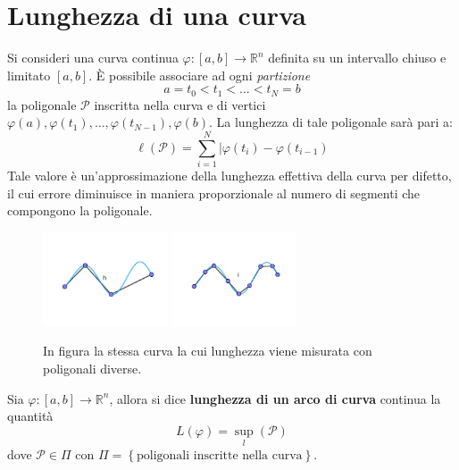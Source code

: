 \section{Lunghezza di una curva}
Si consideri una curva continua $\varphi:[a,b] \to \mathbb{R}^n$ definita su un intervallo chiuso e limitato $[a,b]$. È possibile associare ad ogni \textit{partizione} 
\begin{equation}
    a=t_0<t_1<...<t_N=b
\end{equation}
la poligonale $\mathcal{P}$ inscritta nella curva e di vertici $\varphi(a),\varphi(t_1),\dots,\varphi(t_{N-1}), \varphi(b)$. La lunghezza di tale poligonale sarà pari a:
\begin{equation}
    \ell(\mathcal{P})=\sum\limits_{i=1}^{N}{|\varphi(t_i)-\varphi(t_{i-1})}
\end{equation}
Tale valore è un'approssimazione della lunghezza effettiva della curva per difetto, il cui errore diminuisce in maniera proporzionale al numero di segmenti che compongono la poligonale.
\begin{figure}[H]
    \centering
    \includegraphics[width=0.33\textwidth]{Capitoli/Capitolo1/lunghezza1.png}
    \hspace{0.05\textwidth} %
    \includegraphics[width=0.33\textwidth]{Capitoli/Capitolo1/lunghezza2.png}
    \caption{In figura la stessa curva la cui lunghezza viene misurata con poligonali diverse.}
\end{figure}
\begin{definition}
    Sia $\varphi:[a,b]\to \mathbb{R}^n$, allora si dice \textbf{lunghezza di un arco di curva} continua la quantità
    \begin{equation}
        L(\varphi)=\sup\limits_{l}(\mathcal{P})
    \end{equation}
    dove $\mathcal{P} \in \Pi$ con $\Pi=\left\{\text{poligonali inscritte nella curva}\right\}$.
\end{definition}
